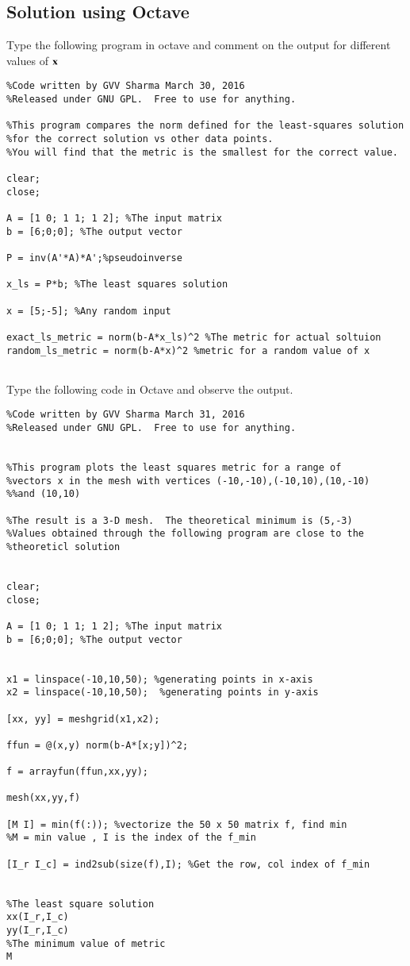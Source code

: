 \subsection{Solution using Octave}
\begin{problem}
	Type the following program in octave and comment on the output for different values of $\mathbf{x}$
	\begin{verbatim}
%Code written by GVV Sharma March 30, 2016
%Released under GNU GPL.  Free to use for anything.

%This program compares the norm defined for the least-squares solution
%for the correct solution vs other data points.
%You will find that the metric is the smallest for the correct value.

clear;
close;

A = [1 0; 1 1; 1 2]; %The input matrix
b = [6;0;0]; %The output vector

P = inv(A'*A)*A';%pseudoinverse

x_ls = P*b; %The least squares solution

x = [5;-5]; %Any random input

exact_ls_metric = norm(b-A*x_ls)^2 %The metric for actual soltuion
random_ls_metric = norm(b-A*x)^2 %metric for a random value of x
	
	\end{verbatim}

\end{problem}
%
\begin{problem}
	Type the following code in Octave and observe the output.
\begin{verbatim}
%Code written by GVV Sharma March 31, 2016
%Released under GNU GPL.  Free to use for anything.


%This program plots the least squares metric for a range of
%vectors x in the mesh with vertices (-10,-10),(-10,10),(10,-10)
%%and (10,10)

%The result is a 3-D mesh.  The theoretical minimum is (5,-3)
%Values obtained through the following program are close to the 
%theoreticl solution


clear;
close;

A = [1 0; 1 1; 1 2]; %The input matrix
b = [6;0;0]; %The output vector


x1 = linspace(-10,10,50); %generating points in x-axis
x2 = linspace(-10,10,50);  %generating points in y-axis

[xx, yy] = meshgrid(x1,x2);

ffun = @(x,y) norm(b-A*[x;y])^2;

f = arrayfun(ffun,xx,yy);

mesh(xx,yy,f)

[M I] = min(f(:)); %vectorize the 50 x 50 matrix f, find min
%M = min value , I is the index of the f_min

[I_r I_c] = ind2sub(size(f),I); %Get the row, col index of f_min


%The least square solution
xx(I_r,I_c) 
yy(I_r,I_c)
%The minimum value of metric
M

\end{verbatim}
\end{problem}
